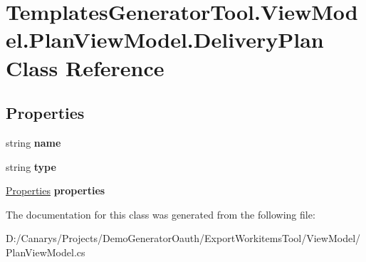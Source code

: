 \hypertarget{class_templates_generator_tool_1_1_view_model_1_1_plan_view_model_1_1_delivery_plan}{}\section{Templates\+Generator\+Tool.\+View\+Model.\+Plan\+View\+Model.\+Delivery\+Plan Class Reference}
\label{class_templates_generator_tool_1_1_view_model_1_1_plan_view_model_1_1_delivery_plan}
\subsection*{Properties}
\begin{DoxyCompactItemize}
\item 
\mbox{\label{class_templates_generator_tool_1_1_view_model_1_1_plan_view_model_1_1_delivery_plan_a316504b55a5d9d22cd18716014e75e15}} 
string {\bfseries name}
\item 
\mbox{\label{class_templates_generator_tool_1_1_view_model_1_1_plan_view_model_1_1_delivery_plan_a1a6b90bad5f77638dfaf9486a6617248}} 
string {\bfseries type}
\item 
\mbox{\label{class_templates_generator_tool_1_1_view_model_1_1_plan_view_model_1_1_delivery_plan_adf2960d81504258742efbbcd3a062dbf}} 
\mbox{\hyperlink{class_templates_generator_tool_1_1_view_model_1_1_plan_view_model_1_1_properties}{Properties}} {\bfseries properties}
\end{DoxyCompactItemize}


The documentation for this class was generated from the following file\+:\begin{DoxyCompactItemize}
\item 
D\+:/\+Canarys/\+Projects/\+Demo\+Generator\+Oauth/\+Export\+Workitems\+Tool/\+View\+Model/Plan\+View\+Model.\+cs\end{DoxyCompactItemize}
